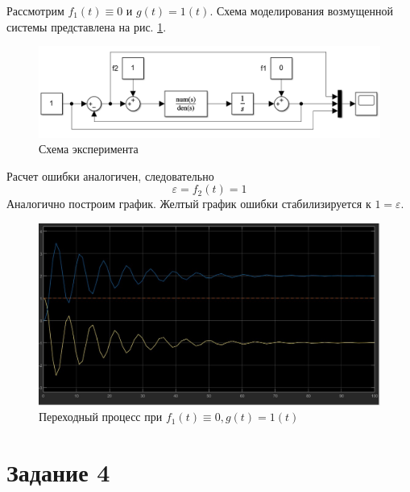 \documentclass[a4paper, 12pt]{article}
\begin{document}
    Рассмотрим $f_1(t)\equiv0$ и $g(t)=1(t)$. Схема моделирования возмущенной системы
    представлена на рис. \ref{fig:scheme3_2}.
    \begin{figure}[H]
        \centering
        \includegraphics[scale=0.6]{scheme3_2.png}
        \captionsetup{skip=0pt}
        \caption{Схема эксперимента}
        \label{fig:scheme3_2}
    \end{figure}
    \noindent Расчет ошибки аналогичен, следовательно
    $$\varepsilon=f_2(t)=1$$
    Аналогично построим график. Желтый график ошибки стабилизируется к $1=\varepsilon$.
    \begin{figure}[H]
        \centering
        \includegraphics[scale=0.3]{task_3_f1=0.jpg}
        \captionsetup{skip=0pt}
        \caption{Переходный процесс при $f_1(t)\equiv0,g(t)=1(t)$}
        \label{fig:t3f1eq0}
    \end{figure}


    \section{Задание 4}
\end{document}
